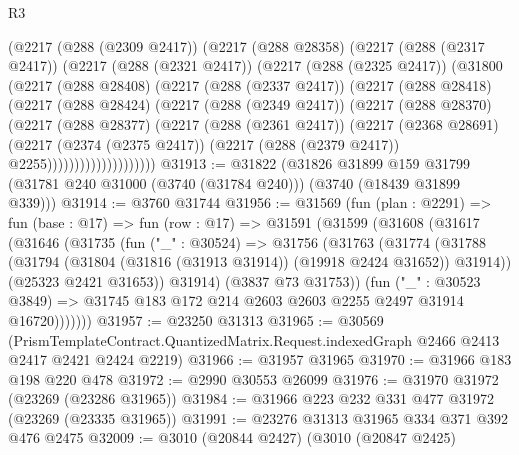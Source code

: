 \begin{lexlean}{R3}
\begin{coremodule}
          (@2217
            (@288 (@2309 @2417))
            (@2217
              (@288 @28358)
              (@2217
                (@288 (@2317 @2417))
                (@2217
                  (@288 (@2321 @2417))
                  (@2217
                    (@288 (@2325 @2417))
                    (@31800
                      (@2217
                        (@288 @28408)
                        (@2217
                          (@288 (@2337 @2417))
                          (@2217
                            (@288 @28418)
                            (@2217
                              (@288 @28424)
                              (@2217
                                (@288 (@2349 @2417))
                                (@2217
                                  (@288 @28370)
                                  (@2217
                                    (@288 @28377)
                                    (@2217
                                      (@288 (@2361 @2417))
                                      (@2217
                                        (@2368 @28691)
                                        (@2217
                                          (@2374 (@2375 @2417))
                                          (@2217 (@288 (@2379 @2417)) @2255))))))))))))))))))))
@31913 := @31822
    (@31826
      @31899
      @159
      @31799
      (@31781 @240 @31000 (@3740 (@31784 @240)))
      (@3740 (@18439 @31899 @339)))
@31914 := @3760 @31744
@31956 := @31569
    (fun (plan : @2291) =>
    fun (base : @17) =>
    fun (row : @17) =>
    @31591
      (@31599
        (@31608
          (@31617
            (@31646
              (@31735
                (fun ("_" : @30524) =>
                @31756
                  (@31763
                    (@31774
                      (@31788
                        (@31794 (@31804 (@31816 (@31913 @31914)) (@19918 @2424 @31652)) @31914))
                      (@25323 @2421 @31653))
                    @31914)
                  (@3837 @73 @31753))
                (fun ("_" : @30523 @3849) =>
                @31745 @183 @172 @214 @2603 @2603 @2255 @2497 @31914 @16720)))))))
@31957 := @23250 @31313
@31965 := @30569
    (PrismTemplateContract.QuantizedMatrix.Request.indexedGraph @2466 @2413 @2417 @2421 @2424 @2219)
@31966 := @31957 @31965
@31970 := @31966 @183 @198 @220 @478
@31972 := @2990 @30553 @26099
@31976 := @31970 @31972 (@23269 (@23286 @31965))
@31984 := @31966 @223 @232 @331 @477 @31972 (@23269 (@23335 @31965))
@31991 := @23276 @31313 @31965 @334 @371 @392 @476 @2475
@32009 := @3010
    (@20844 @2427)
    (@3010
      (@20847 @2425)

\end{coremodule}
\end{lexlean}
